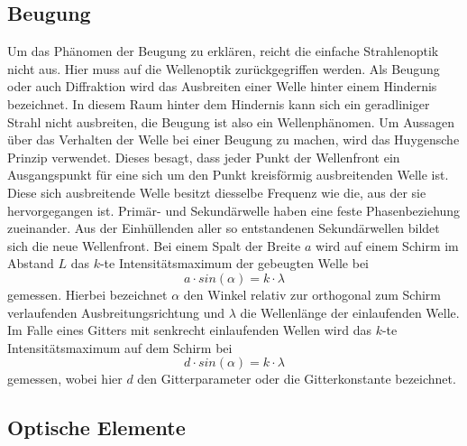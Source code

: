 \subsection{Beugung}
\label{sec:beugung}
Um das Phänomen der Beugung zu erklären, reicht die einfache Strahlenoptik nicht aus. Hier muss auf die Wellenoptik
zurückgegriffen werden. Als Beugung oder auch Diffraktion wird das Ausbreiten einer Welle hinter einem
Hindernis bezeichnet. In diesem Raum hinter dem Hindernis kann sich ein geradliniger Strahl nicht ausbreiten, die Beugung ist 
also ein Wellenphänomen. Um Aussagen über das Verhalten der Welle bei einer Beugung zu machen, wird das Huygensche
Prinzip verwendet. Dieses besagt, dass jeder Punkt der Wellenfront ein Ausgangspunkt für eine sich um den Punkt kreisförmig
ausbreitenden Welle ist. Diese sich ausbreitende Welle besitzt diesselbe Frequenz wie die, aus der sie hervorgegangen
ist. Primär- und Sekundärwelle haben eine feste Phasenbeziehung zueinander. Aus der Einhüllenden aller so
entstandenen Sekundärwellen bildet sich die neue Wellenfront. Bei einem Spalt der Breite $a$ wird auf einem Schirm
im Abstand $L$ das $k$-te Intensitätsmaximum der gebeugten Welle bei
\begin{equation}
  \label{eqn:spaltintmax}
  a \cdot sin(\alpha) = k \cdot \lambda
\end{equation}
gemessen. Hierbei bezeichnet $\alpha$ den Winkel relativ zur orthogonal zum Schirm verlaufenden Ausbreitungsrichtung
und $\lambda$ die Wellenlänge der einlaufenden Welle.
Im Falle eines Gitters mit senkrecht einlaufenden Wellen wird das $k$-te Intensitätsmaximum auf dem Schirm bei
\begin{equation}
  \label{eqn:gitterintmax}
  d \cdot sin(\alpha) = k \cdot \lambda
\end{equation}
gemessen, wobei hier $d$ den Gitterparameter oder die Gitterkonstante bezeichnet.

\subsection{Optische Elemente}
\label{sec:optischeelemente}

